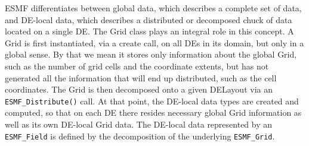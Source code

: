 ESMF differentiates between global data, which describes a complete set of data,
and DE-local data, which describes a distributed or decomposed chuck of data
located on a single DE.  The Grid class plays an integral role in this concept.
A Grid is first instantiated, via a create call, on all DEs in its domain, but
only in a global sense.  By that we mean it stores only information about the
global Grid, such as the number of grid cells and the coordinate extents, but
has not generated all the information that will end up distributed, such as the
cell coordinates.  The Grid is then decomposed onto a given DELayout via an
{\tt ESMF\_Distribute()} call.  At that point, the DE-local data types are
created and computed, so that on each DE there resides necessary global Grid
information as well as its own DE-local Grid data.  The DE-local data represented
by an {\tt ESMF\_Field} is defined by the decomposition of the underlying
{\tt ESMF\_Grid}.

